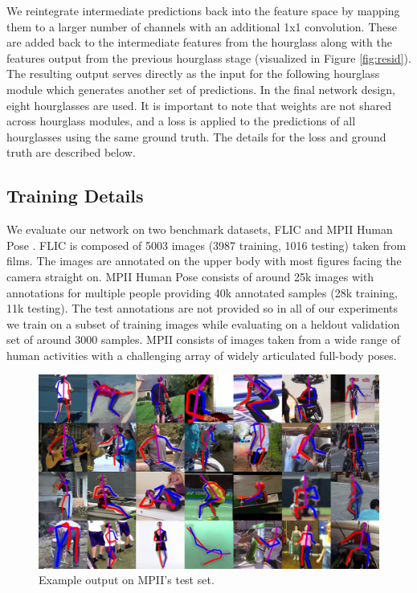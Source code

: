 \documentclass[runningheads]{llncs}
\begin{document}
We reintegrate intermediate predictions back into the feature space by
mapping them to a larger number of channels with an additional 1x1
convolution. These are added back to the intermediate features from
the hourglass along with the features output from the previous
hourglass stage (visualized in Figure \ref{fig:resid}). The resulting
output serves directly as the input for the following hourglass module
which generates another set of predictions. In the final network
design, eight hourglasses are used. It is important to note that
weights are not shared across hourglass modules, and a loss is applied
to the predictions of all hourglasses using the same ground truth. The
details for the loss and ground truth are described below.

\subsection{Training Details}

We evaluate our network on two benchmark datasets, FLIC
\cite{sapp2013modec} and MPII Human Pose \cite{andriluka20142d}. FLIC
is composed of 5003 images (3987 training, 1016 testing) taken from
films. The images are annotated on the upper body with most
figures facing the camera straight on. MPII Human Pose consists of
around 25k images with annotations for multiple people providing 40k
annotated samples (28k training, 11k testing). The test annotations
are not provided so in all of our experiments we train on a subset of
training images while evaluating on a heldout validation set of around
3000 samples. MPII consists of images taken from a wide range of human
activities with a challenging array of widely articulated full-body
poses.

\begin{figure}[t]
\centering
\includegraphics[width=\textwidth]{img/pos-examples}
\caption{Example output on MPII's test set.}
\label{fig:pos-examples}
\end{figure}
\end{document}
